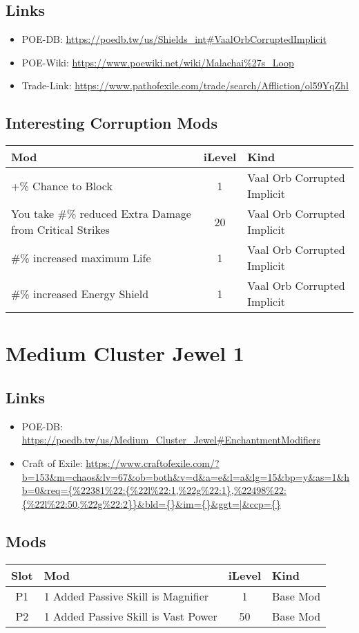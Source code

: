 \subsection{Links}
\begin{itemize}
	\item POE-DB: \url{https://poedb.tw/us/Shields_int#VaalOrbCorruptedImplicit}
	\item POE-Wiki: \url{https://www.poewiki.net/wiki/Malachai%27s_Loop}
	\item Trade-Link: \url{https://www.pathofexile.com/trade/search/Affliction/ol59YqZhl}
\end{itemize}

\subsection{Interesting Corruption Mods}
\begin{tabular}{|l|c|l|}
	\hline
	Mod&iLevel&Kind\\\hline
	+\% Chance to Block &1& Vaal Orb Corrupted Implicit \\\hline
	You take \#\% reduced Extra Damage from Critical Strikes&20& Vaal Orb Corrupted Implicit \\\hline
	\#\% increased maximum Life&1& Vaal Orb Corrupted Implicit \\\hline
	\#\% increased Energy Shield&1& Vaal Orb Corrupted Implicit \\\hline
\end{tabular}

\section{Medium Cluster Jewel 1}
\subsection{Links}
\begin{itemize}
	\item POE-DB: \url{https://poedb.tw/us/Medium_Cluster_Jewel#EnchantmentModifiers}
	\item Craft of Exile: \url{https://www.craftofexile.com/?b=153&m=chaos&lv=67&ob=both&v=d&a=e&l=a&lg=15&bp=y&as=1&hb=0&req={%
\end{itemize}
\subsection{Mods}
\begin{tabular}{|c|l|c|l|}
	\hline
	Slot&Mod&iLevel&Kind\\\hline
	P1& 1 Added Passive Skill is Magnifier&1& Base Mod \\\hline
	P2& 1 Added Passive Skill is Vast Power&50& Base Mod \\\hline
\end{tabular}

